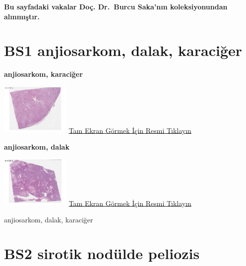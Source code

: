 \documentclass[
  letterpaper,
  DIV=11,
  numbers=noendperiod]{scrreprt}
\begin{document}
\textbf{Bu sayfadaki vakalar Doç. Dr.~Burcu Saka'nın koleksiyonundan
alınmıştır.}

\hypertarget{sec-BS1}{%
\section{BS1 anjiosarkom, dalak, karaciğer}\label{sec-BS1}}

\textbf{anjiosarkom, karaciğer}

\href{https://images.patolojiatlasi.com/BS1/HE1.html}{\includegraphics[width=0.25\textwidth,height=\textheight]{./screenshots/BS1-HE1_screenshot.png}}
\href{https://images.patolojiatlasi.com/BS1/HE1.html}{Tam Ekran Görmek
İçin Resmi Tıklayın}

\textbf{anjiosarkom, dalak}

\href{https://images.patolojiatlasi.com/BS1/HE2.html}{\includegraphics[width=0.25\textwidth,height=\textheight]{./screenshots/BS1-HE2_screenshot.png}}
\href{https://images.patolojiatlasi.com/BS1/HE2.html}{Tam Ekran Görmek
İçin Resmi Tıklayın}

\begin{tcolorbox}[enhanced jigsaw, left=2mm, toprule=.15mm, rightrule=.15mm, bottomrule=.15mm, leftrule=.75mm, colback=white, colframe=quarto-callout-tip-color-frame, toptitle=1mm, breakable, titlerule=0mm, colbacktitle=quarto-callout-tip-color!10!white, bottomtitle=1mm, title=\textcolor{quarto-callout-tip-color}{\faLightbulb}\hspace{0.5em}{Tanı}, arc=.35mm, opacitybacktitle=0.6, opacityback=0, coltitle=black]

anjiosarkom, dalak, karaciğer

\end{tcolorbox}

\hypertarget{sec-BS2}{%
\section{BS2 sirotik nodülde peliozis}\label{sec-BS2}}
\end{document}
